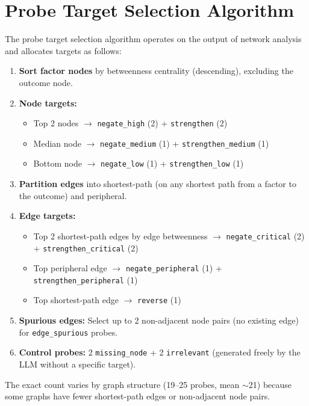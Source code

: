 \documentclass[11pt]{article}
\begin{document}
\section{Probe Target Selection Algorithm}
\label{app:target-selection}

The probe target selection algorithm operates on the output of network analysis and allocates targets as follows:

\begin{enumerate}
\item \textbf{Sort factor nodes} by betweenness centrality (descending), excluding the outcome node.
\item \textbf{Node targets:}
    \begin{itemize}
    \item Top 2 nodes $\rightarrow$ \texttt{negate\_high} (2) + \texttt{strengthen} (2)
    \item Median node $\rightarrow$ \texttt{negate\_medium} (1) + \texttt{strengthen\_medium} (1)
    \item Bottom node $\rightarrow$ \texttt{negate\_low} (1) + \texttt{strengthen\_low} (1)
    \end{itemize}
\item \textbf{Partition edges} into shortest-path (on any shortest path from a factor to the outcome) and peripheral.
\item \textbf{Edge targets:}
    \begin{itemize}
    \item Top 2 shortest-path edges by edge betweenness $\rightarrow$ \texttt{negate\_critical} (2) + \texttt{strengthen\_critical} (2)
    \item Top peripheral edge $\rightarrow$ \texttt{negate\_peripheral} (1) + \texttt{strengthen\_peripheral} (1)
    \item Top shortest-path edge $\rightarrow$ \texttt{reverse} (1)
    \end{itemize}
\item \textbf{Spurious edges:} Select up to 2 non-adjacent node pairs (no existing edge) for \texttt{edge\_spurious} probes.
\item \textbf{Control probes:} 2 \texttt{missing\_node} + 2 \texttt{irrelevant} (generated freely by the LLM without a specific target).
\end{enumerate}

The exact count varies by graph structure (19--25 probes, mean ${\sim}$21) because some graphs have fewer shortest-path edges or non-adjacent node pairs.
\end{document}
